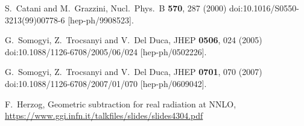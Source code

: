 \documentclass[11pt,a4paper]{article}
\begin{document}
\begin{thebibliography}{9}

  S.~Catani and M.~Grazzini,
  Nucl.\ Phys.\ B {\bf 570}, 287 (2000)
  doi:10.1016/S0550-3213(99)00778-6
  [hep-ph/9908523].

  G.~Somogyi, Z.~Trocsanyi and V.~Del Duca,
  JHEP {\bf 0506}, 024 (2005)
  doi:10.1088/1126-6708/2005/06/024
  [hep-ph/0502226].

  G.~Somogyi, Z.~Trocsanyi and V.~Del Duca,
  JHEP {\bf 0701}, 070 (2007)
  doi:10.1088/1126-6708/2007/01/070
  [hep-ph/0609042].
  
	F.~Herzog,
	Geometric subtraction for real radiation at NNLO,
	\url{https://www.ggi.infn.it/talkfiles/slides/slides4304.pdf}
 
\end{thebibliography}
\end{document}
